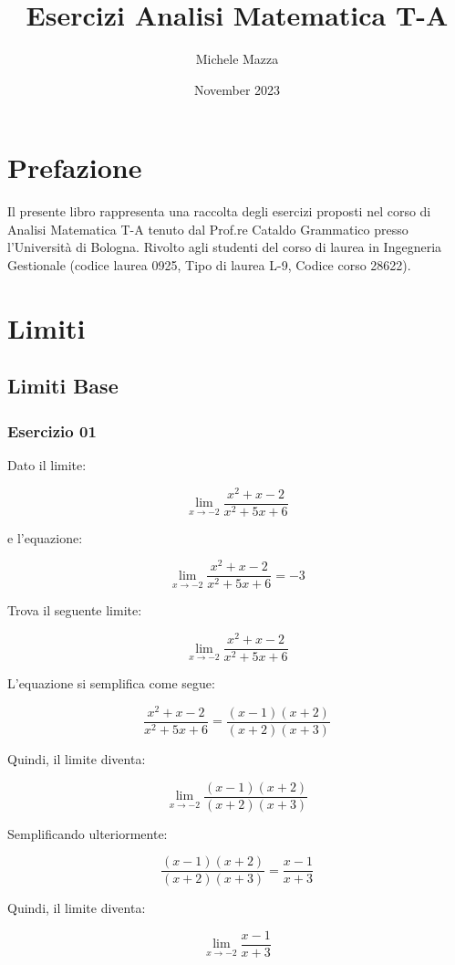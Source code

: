 \documentclass{book}
\title{Esercizi Analisi Matematica T-A}
\author{Michele Mazza}
\date{November 2023}
\begin{document}
\frontmatter
\maketitle
\tableofcontents

\chapter*{Prefazione}
Il presente libro rappresenta una raccolta degli esercizi proposti nel corso di Analisi Matematica T-A tenuto dal Prof.re Cataldo Grammatico presso l'Università di Bologna. Rivolto agli studenti del corso di laurea in Ingegneria Gestionale (codice laurea 0925, Tipo di laurea L-9, Codice corso 28622).

\mainmatter
\chapter{Limiti}
\section{Limiti Base}

\subsection{Esercizio 01}

Dato il limite:

\[
    \lim_{{x \to -2}} \frac{{x^2 + x - 2}}{{x^2 + 5x + 6}}
\]

e l'equazione:

\[
    \lim_{{x \to -2}} \frac{{x^2 + x - 2}}{{x^2 + 5x + 6}} = -3
\]

Trova il seguente limite:

\[
    \lim_{{x \to -2}} \frac{{x^2 + x - 2}}{{x^2 + 5x + 6}}
\]

L'equazione si semplifica come segue:

\[
    \frac{{x^2 + x - 2}}{{x^2 + 5x + 6}} = \frac{{(x - 1)(x + 2)}}{{(x + 2)(x + 3)}}
\]

Quindi, il limite diventa:

\[
    \lim_{{x \to -2}} \frac{{(x - 1)(x + 2)}}{{(x + 2)(x + 3)}}
\]

Semplificando ulteriormente:

\[
    \frac{{(x - 1)(x + 2)}}{{(x + 2)(x + 3)}} = \frac{{x - 1}}{{x + 3}}
\]

Quindi, il limite diventa:

\[
    \lim_{{x \to -2}} \frac{{x - 1}}{{x + 3}}
\]
\end{document}
